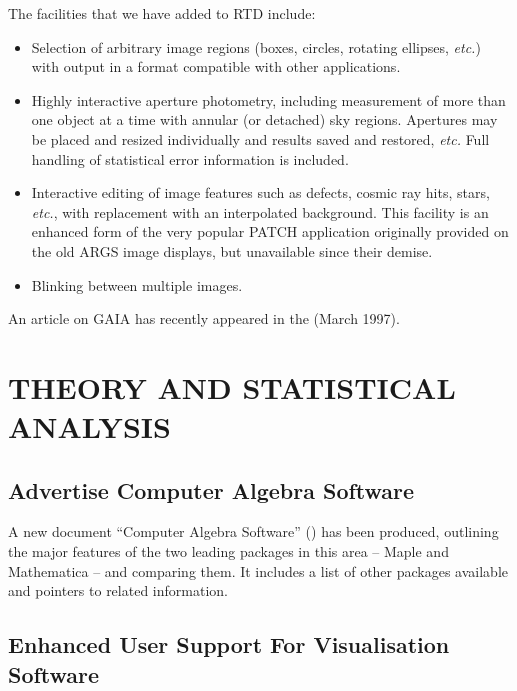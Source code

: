 The facilities that we have added to RTD include:

\begin{itemize}
\item Selection of arbitrary image regions (boxes, circles, rotating
ellipses, {\em etc.}) with output in a format compatible with other
applications.

\item Highly interactive aperture photometry, including measurement of
more than one object at a time with annular (or detached) sky
regions. Apertures may be placed and resized individually and results
saved and restored, {\em etc.} Full handling of statistical error
information is included.

\item Interactive editing of image features such as defects, cosmic
ray hits, stars, {\em etc.}, with replacement with an interpolated
background. This facility is an enhanced form of the very popular
PATCH application originally provided on the old ARGS image displays,
but unavailable since their demise.

\item Blinking between multiple images.
\end{itemize}

An article on GAIA has recently appeared in the
 (March
1997).

\section{THEORY AND STATISTICAL ANALYSIS}

\subsection{Advertise Computer Algebra Software}

A new document ``Computer Algebra Software'' ()
has been produced, outlining the major features of the two leading
packages in this area -- Maple and Mathematica -- and comparing
them. It includes a list of other packages available and pointers to
related information.

\subsection{Enhanced User Support For Visualisation Software}


